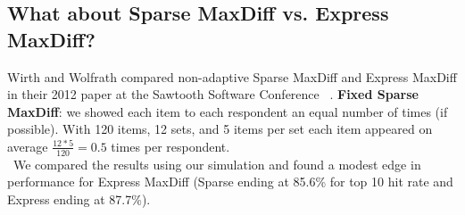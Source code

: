 \documentclass[nonblindrev]{informs3}
\begin{document}
\subsection{What about Sparse MaxDiff vs. Express MaxDiff?}
Wirth and Wolfrath compared non-adaptive Sparse MaxDiff and Express MaxDiff in their 2012 paper at the Sawtooth Software Conference ~\cite{wirth2012largeset}. 
\textbf{Fixed Sparse MaxDiff}: we showed each item to each respondent an equal number of times (if possible).  With 120 items, 12 sets, and 5 items per set each item appeared on average $\frac{12*5}{120} = 0.5$ times per respondent. \\
 We compared the results using our simulation and found a modest edge in performance for Express MaxDiff (Sparse ending at 85.6\% for top 10 hit rate and Express ending at 87.7\%).
\end{document}
